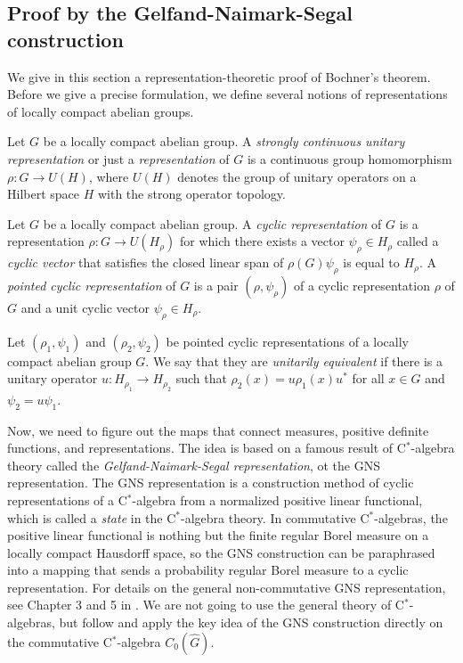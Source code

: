 \documentclass[a4paper]{article}
\begin{document}
\subsection{Proof by the Gelfand-Naimark-Segal construction}

We give in this section a representation-theoretic proof of Bochner's theorem.
Before we give a precise formulation, we define several notions of representations of locally compact abelian groups.

\begin{defn}
Let $G$ be a locally compact abelian group.
A \emph{strongly continuous unitary representation} or just a \emph{representation} of $G$ is a continuous group homomorphism $\rho:G\to U(H)$, where $U(H)$ denotes the group of unitary operators on a Hilbert space $H$ with the strong operator topology.
\end{defn}

\begin{defn}
Let $G$ be a locally compact abelian group.
A \emph{cyclic representation} of $G$ is a representation $\rho:G\to U(H_\rho)$ for which there exists a vector $\psi_\rho\in H_\rho$ called a \emph{cyclic vector} that satisfies the closed linear span of $\rho(G)\psi_\rho$ is equal to $H_\rho$.
A \emph{pointed cyclic representation} of $G$ is a pair $(\rho,\psi_\rho)$ of a cyclic representation $\rho$ of $G$ and a unit cyclic vector $\psi_\rho\in H_\rho$.
\end{defn}

\begin{defn}
Let $(\rho_1,\psi_1)$ and $(\rho_2,\psi_2)$ be pointed cyclic representations of a locally compact abelian group $G$.
We say that they are \emph{unitarily equivalent} if there is a unitary operator $u:H_{\rho_1}\to H_{\rho_2}$ such that $\rho_2(x)=u\rho_1(x)u^*$ for all $x\in G$ and $\psi_2=u\psi_1$.
\end{defn}

Now, we need to figure out the maps that connect measures, positive definite functions, and representations.
The idea is based on a famous result of C$^*$-algebra theory called the \emph{Gelfand-Naimark-Segal representation}, ot the GNS representation.
The GNS representation is a construction method of cyclic representations of a C$^*$-algebra from a normalized positive linear functional, which is called a \emph{state} in the C$^*$-algebra theory.
In commutative C$^*$-algebras, the positive linear functional is nothing but the finite regular Borel measure on a locally compact Hausdorff space, so the GNS construction can be paraphrased into a mapping that sends a probability regular Borel measure to a cyclic representation.
For details on the general non-commutative GNS representation, see Chapter 3 and 5 in \cite{murphy2014c}.
We are not going to use the general theory of C$^*$-algebras, but follow and apply the key idea of the GNS construction directly on the commutative C$^*$-algebra $C_0(\hat G)$.
\end{document}
